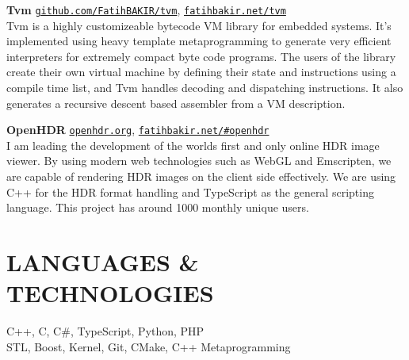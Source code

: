 \documentclass[line]{res}
\begin{document}
\begin{resume}
  \textbf{Tvm} \href{http://github.com/FatihBAKIR/tvm}{\texttt{github.com/FatihBAKIR/tvm}}, \href{http://fatihbakir.net/tvm}{\texttt{fatihbakir.net/tvm}} \\
  Tvm is a highly customizeable bytecode VM library for embedded systems. It's implemented using heavy template metaprogramming to generate very efficient interpreters for extremely compact byte code programs. The users of the library create their own virtual machine by defining their state and instructions using a compile time list, and Tvm handles decoding and dispatching instructions. It also generates a recursive descent based assembler from a VM description.
  
 
  \textbf{OpenHDR} \texttt{\href{https://openhdr.org}{openhdr.org}}, \texttt{\href{http://fatihbakir.net/\#openhdr}{fatihbakir.net/\#openhdr}} \\
  I am leading the development of the worlds first and only online HDR image viewer. By using modern web technologies such as WebGL and Emscripten, we are capable of rendering HDR images on the client side effectively. We are using C++ for the HDR format handling and TypeScript as the general scripting language. This project has around 1000 monthly unique users.
  
  \iffalse
  \textbf{E2EHDR} \texttt{\href{http://fatihbakir.net/\#e2ehdr}{fatihbakir.net/\#e2ehdr}} \\
  E2EHDR is my senior design project which is a real time end to end HDR video solution. We are using two heteregeneous regular cameras to acquire video streams with different exposures. We are using GPGPU methods to align the different frames and generate HDR images. At the end of the pipeline, we have a custom built display solution that is capable of displaying HDR content. C++ and GLSL. This project won 4th place among 27 projects in graduation projects contest.
  \fi
  
\section{LANGUAGES \& TECHNOLOGIES}
	C++, C, C\#, TypeScript, Python, PHP\\
  	STL, Boost, Kernel, Git, CMake, C++ Metaprogramming
 

\end{resume}
\end{document}
